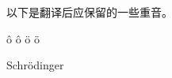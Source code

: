 \documentclass{article}
\begin{document}
以下是翻译后应保留的一些重音。  

\^{o} \^{o} \"{o} \"{o}  

Schr\"{o}dinger  


  
\end{document}
